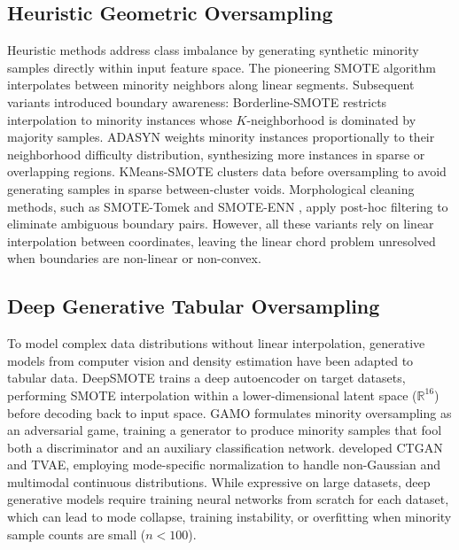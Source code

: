 \documentclass[sn-basic]{sn-jnl}
\begin{document}
\subsection{Heuristic Geometric Oversampling}
Heuristic methods address class imbalance by generating synthetic minority samples directly within input feature space. The pioneering SMOTE algorithm \citep{chawla2002smote} interpolates between minority neighbors along linear segments. Subsequent variants introduced boundary awareness: Borderline-SMOTE \citep{han2005borderline} restricts interpolation to minority instances whose $K$-neighborhood is dominated by majority samples. ADASYN \citep{he2008adasyn} weights minority instances proportionally to their neighborhood difficulty distribution, synthesizing more instances in sparse or overlapping regions. KMeans-SMOTE \citep{douzas2018improving} clusters data before oversampling to avoid generating samples in sparse between-cluster voids. Morphological cleaning methods, such as SMOTE-Tomek and SMOTE-ENN \citep{batista2004study}, apply post-hoc filtering to eliminate ambiguous boundary pairs. However, all these variants rely on linear interpolation between coordinates, leaving the linear chord problem unresolved when boundaries are non-linear or non-convex.

\subsection{Deep Generative Tabular Oversampling}
To model complex data distributions without linear interpolation, generative models from computer vision and density estimation have been adapted to tabular data. DeepSMOTE \citep{dinsdale2021deepsmote} trains a deep autoencoder on target datasets, performing SMOTE interpolation within a lower-dimensional latent space ($\mathbb{R}^{16}$) before decoding back to input space. GAMO \citep{mullick2020generative} formulates minority oversampling as an adversarial game, training a generator to produce minority samples that fool both a discriminator and an auxiliary classification network. \citet{xu2019modeling} developed CTGAN and TVAE, employing mode-specific normalization to handle non-Gaussian and multimodal continuous distributions. While expressive on large datasets, deep generative models require training neural networks from scratch for each dataset, which can lead to mode collapse, training instability, or overfitting when minority sample counts are small ($n < 100$).
\end{document}
